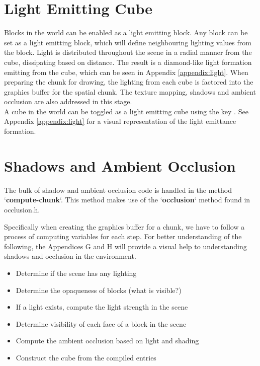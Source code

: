 \documentclass{book}
\begin{document}
\section{Light Emitting Cube}
Blocks in the world can be enabled as a light emitting block.  Any block can be set as a light emitting block, which will define neighbouring lighting values from the block.  Light is distributed throughout the scene in a radial manner from the cube, dissipating based on distance.  The result is a diamond-like light formation emitting from the cube, which can be seen in Appendix \ref{appendix:light}.  When preparing the chunk for drawing, the lighting from each cube is factored into the graphics buffer for the spatial chunk.  The texture mapping, shadows and ambient occlusion are also addressed in this stage.  
\\
A cube in the world can be toggled as a light emitting cube using the key .  See Appendix \ref{appendix:light} for a visual representation of the light emittance formation.
    
\section{Shadows and Ambient Occlusion}
    
The bulk of shadow and ambient occlusion code is handled in the method `\textbf{compute-chunk}`. This method makes use of the `\textbf{occlusion}` method found in occlusion.h.  
    
Specifically when creating the graphics buffer for a chunk, we have to follow a process of computing variables for each step.  For better understanding of the following, the Appendices G and H will provide a visual help to understanding shadows and occlusion in the environment.
    
\begin{itemize}
	\item Determine if the scene has any lighting
	\item Determine the opaqueness of blocks (what is visible?)
	\item If a light exists, compute the light strength in the scene
	\item Determine visibility of each face of a block in the scene
	\item Compute the ambient occlusion based on light and shading
	\item Construct the cube from the compiled entries
\end{itemize}
    
\end{document}
